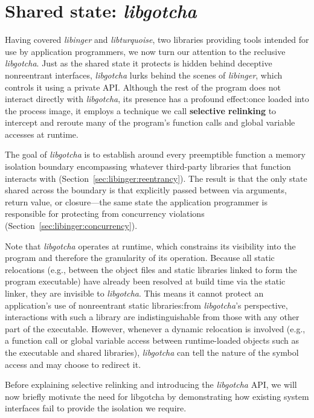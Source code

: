 \section{Shared state: \textit{libgotcha}}
\label{sec:libgotcha}


Having covered \textit{libinger} and \textit{libturquoise}, two libraries providing
tools intended for use by application programmers, we now turn our attention to the
reclusive \textit{libgotcha}.  Just as the shared state it protects is hidden behind
deceptive nonreentrant interfaces, \textit{libgotcha} lurks behind the scenes of
\textit{libinger}, which controls it using a private API.  Although the rest of the
program does not interact directly with \textit{libgotcha}, its presence has a
profound effect:\@ once loaded into the process image, it employs a technique we call
\textbf{selective relinking} to intercept and reroute many of the program's function
calls and global variable accesses at runtime.

The goal of \textit{libgotcha} is to establish around every preemptible function a
memory isolation boundary encompassing whatever third-party libraries that function
interacts with (Section~\ref{sec:libinger:reentrancy}).  The result is that the only
state shared across the boundary is that explicitly passed between via arguments,
return value, or closure---the same state the application programmer is responsible
for protecting from concurrency violations (Section~\ref{sec:libinger:concurrency}).

Note that \textit{libgotcha} operates at runtime, which constrains its visibility
into the program and therefore the granularity of its operation.  Because all static
relocations (e.g., between the object files and static libraries linked to form the
program executable) have already been resolved at build time via the static linker,
they are invisible to \textit{libgotcha}.  This means it cannot protect an
application's use of nonreentrant static libraries:\@ from \textit{libgotcha}'s
perspective, interactions with such a library are indistinguishable from those with
any other part of the executable.  However, whenever a dynamic relocation is involved
(e.g., a function call or global variable access between runtime-loaded objects such
as the executable and shared libraries), \textit{libgotcha} can tell the nature of
the symbol access and may choose to redirect it.

Before explaining selective relinking and introducing the \textit{libgotcha} API, we
will now briefly motivate the need for libgotcha by demonstrating how existing system
interfaces fail to provide the isolation we require.


